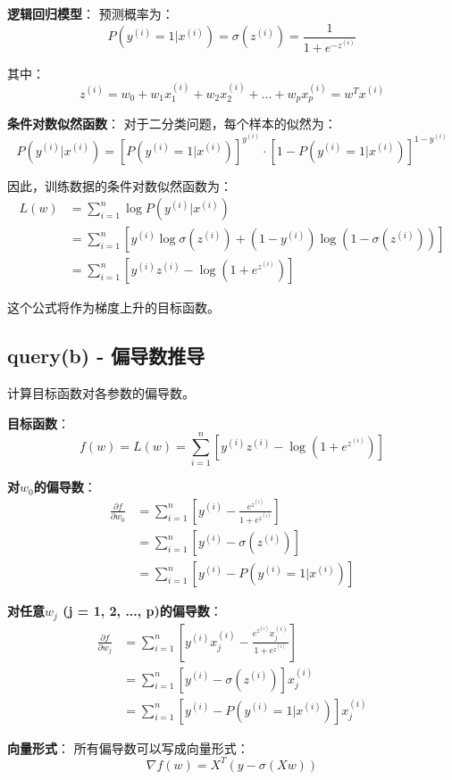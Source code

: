 \documentclass[a4paper]{article}
\begin{document}
\textbf{逻辑回归模型}：
预测概率为：
$$P(y^{(i)} = 1 | x^{(i)}) = \sigma(z^{(i)}) = \frac{1}{1 + e^{-z^{(i)}}}$$

其中：
$$z^{(i)} = w_0 + w_1 x_1^{(i)} + w_2 x_2^{(i)} + ... + w_p x_p^{(i)} = w^T x^{(i)}$$

\textbf{条件对数似然函数}：
对于二分类问题，每个样本的似然为：
$$P(y^{(i)} | x^{(i)}) = [P(y^{(i)} = 1 | x^{(i)})]^{y^{(i)}} \cdot [1 - P(y^{(i)} = 1 | x^{(i)})]^{1-y^{(i)}}$$

因此，训练数据的条件对数似然函数为：
\begin{align}
L(w) &= \sum_{i=1}^{n} \log P(y^{(i)} | x^{(i)}) \\
&= \sum_{i=1}^{n} [y^{(i)} \log \sigma(z^{(i)}) + (1-y^{(i)}) \log(1-\sigma(z^{(i)}))] \\
&= \sum_{i=1}^{n} [y^{(i)} z^{(i)} - \log(1 + e^{z^{(i)}})]
\end{align}

这个公式将作为梯度上升的目标函数。

\subsection{query(b) - 偏导数推导}

计算目标函数对各参数的偏导数。

\textbf{目标函数}：
$$f(w) = L(w) = \sum_{i=1}^{n} [y^{(i)} z^{(i)} - \log(1 + e^{z^{(i)}})]$$

\textbf{对$w_0$的偏导数}：
\begin{align}
\frac{\partial f}{\partial w_0} &= \sum_{i=1}^{n} \left[y^{(i)} - \frac{e^{z^{(i)}}}{1 + e^{z^{(i)}}}\right] \\
&= \sum_{i=1}^{n} [y^{(i)} - \sigma(z^{(i)})] \\
&= \sum_{i=1}^{n} [y^{(i)} - P(y^{(i)} = 1 | x^{(i)})]
\end{align}

\textbf{对任意$w_j$ (j = 1, 2, ..., p)的偏导数}：
\begin{align}
\frac{\partial f}{\partial w_j} &= \sum_{i=1}^{n} \left[y^{(i)} x_j^{(i)} - \frac{e^{z^{(i)}} x_j^{(i)}}{1 + e^{z^{(i)}}}\right] \\
&= \sum_{i=1}^{n} [y^{(i)} - \sigma(z^{(i)})] x_j^{(i)} \\
&= \sum_{i=1}^{n} [y^{(i)} - P(y^{(i)} = 1 | x^{(i)})] x_j^{(i)}
\end{align}

\textbf{向量形式}：
所有偏导数可以写成向量形式：
$$\nabla f(w) = X^T (y - \sigma(Xw))$$
\end{document}
